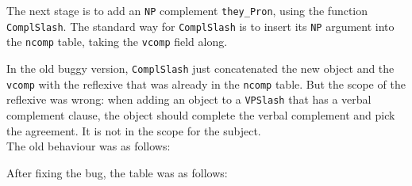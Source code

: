\begin{EmptyItem}
\begin{Highlighting}[]
    \FunctionTok{=}  \NormalTok{;}
\FunctionTok{=}  \OtherTok{=>}  \NormalTok{; } \OtherTok{=>} 
\FunctionTok{=}  \NormalTok{;}
\end{Highlighting}
\end{EmptyItem}

The next stage is to add an \texttt{NP} complement \texttt{they\_Pron},
using the function \texttt{ComplSlash}. The standard way for
\texttt{ComplSlash} is to insert its \texttt{NP} argument into the
\texttt{ncomp} table, taking the \texttt{vcomp} field along.

In the old buggy version, \texttt{ComplSlash} just concatenated the new
object and the \texttt{vcomp} with the reflexive that was already in the
\texttt{ncomp} table. But the scope of the reflexive was wrong: when
adding an object to a \texttt{VPSlash} that has a verbal complement
clause, the object should complete the verbal complement and pick the
agreement. It is not in the scope for the subject.\\
The old behaviour was as follows:

\begin{EmptyItem}
\begin{Highlighting}[]
    \FunctionTok{=}  \NormalTok{;}
\FunctionTok{=}  \OtherTok{=>}  \NormalTok{; } \OtherTok{=>} 
\FunctionTok{=} \NormalTok{[] ;}
\end{Highlighting}
\end{EmptyItem}

After fixing the bug, the table was as follows:

\begin{EmptyItem}
\begin{Highlighting}[]
    \FunctionTok{=}  \NormalTok{;}
\FunctionTok{=} \OtherTok{=>}  \NormalTok{\} ;}
\FunctionTok{=} \NormalTok{[] ;}
\end{Highlighting}
\end{EmptyItem}

